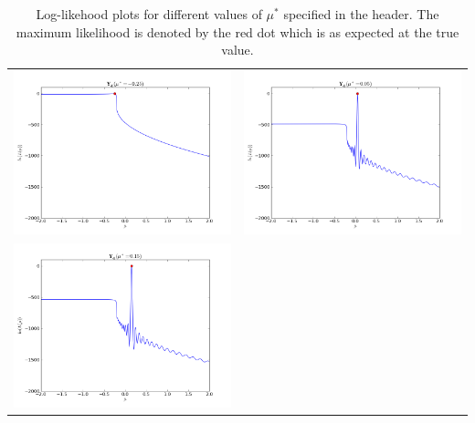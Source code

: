 \documentclass[12pt,a4paper,titlepage]{article}
\begin{document}
\begin{table}[ht]
\begin{tabular}{cc}
\includegraphics[scale=0.3]{likelihood_snic025m}&\includegraphics[scale=0.3]{likelihood_snic005}\\
\newline
\includegraphics[scale=0.3]{likelihood_snic015}
\end{tabular}
\caption{Log-likehood plots for different values of $\mu^*$ specified in the header. The maximum likelihood is denoted by the red dot which is as expected at the true value.}
\label{fig:snic}
\end{table}
\end{document}
